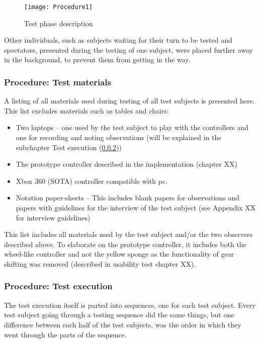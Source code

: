 \begin{figure}[!htbp]
\centering
\texttt{[image: Procedure1]}
\caption{Test phase description} \label{fig:testsetup}
\end{figure}

Other individuals, such as subjects waiting for their turn to be tested and spectators, presented during the testing of one subject, were placed further away in the background, to prevent them from getting in the way.


\subsubsection{Procedure: Test materials}
A listing of all materials used during testing of all test subjects is presented here. 
This list excludes materials such as tables and chairs:
\begin{itemize}
\item Two laptops – one used by the test subject to play with the controllers and one for recording and noting observations (will be explained in the subchapter Test execution (\ref{sec:testexecution}))
\item The prototype controller described in the implementation (chapter XX)
\item Xbox 360 (SOTA) controller compatible with pc.
\item Notation paper-sheets – This includes blank papers for observations and papers with guidelines for the interview of the test subject (see Appendix XX for interview guidelines)

\end{itemize}

This list includes all materials used by the test subject and/or the two observers described above. 
To elaborate on the prototype controller, it includes both the wheel-like controller and not the yellow sponge as the functionality of gear shifting was removed (described in usability test chapter XX).

\subsubsection{Procedure: Test execution} \label{sec:testexecution}
The test execution itself is parted into sequences, one for each test subject. 
Every test subject going through a testing sequence did the same things, but one difference between each half of the test subjects, was the order in which they went through the parts of the sequence.


